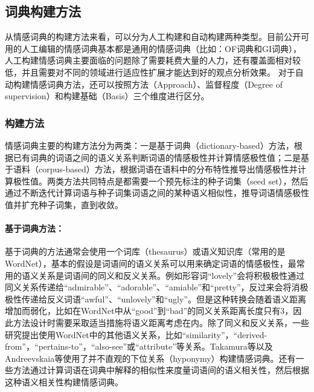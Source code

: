 \subsection{词典构建方法}
从情感词典的构建方法来看，可以分为人工构建和自动构建两种类型。目前公开可用的人工编辑的情感词典基本都是通用的情感词典（比如：OF词典和GI词典），人工构建情感词典主要面临的问题除了需要耗费大量的人力，还有覆盖面相对较低，并且需要对不同的领域进行适应性扩展才能达到好的观点分析效果。
对于自动构建情感词典方法，还可以按照方法（Approach）、监督程度（Degree of supervision）和构建基础（Basis）三个维度进行区分。

\subsubsection{构建方法}
情感词典主要的构建方法分为两类：一是基于词典（dictionary-based）方法，根据已有词典的词语之间的语义关系判断词语的情感极性并计算情感极性值；二是基于语料（corpus-based）方法，根据词语在语料中的分布特性推导出情感极性并计算极性值。两类方法共同特点是都需要一个预先标注的种子词集（seed set），然后通过不断迭代计算词语与种子词集词语之间的某种语义相似性，推导词语情感极性值并扩充种子词集，直到收敛。

\paragraph{基于词典方法：}
基于词典的方法通常会使用一个词库（thesaurus）或语义知识库（常用的是WordNet），基本的假设是词语间的语义关系可以用来确定词语的情感极性，最常用的语义关系是词语间的同义和反义关系。例如形容词“lovely”会将积极极性通过同义关系传递给“admirable”、“adorable”、“amiable”和“pretty”，反过来会将消极极性传递给反义词语“awful”、“unlovely”和“ugly”。但是这种转换会随着语义距离增加而弱化，比如在WordNet中从“good”到“bad”的同义关系距离长度只有3，因此方法设计时需要采取适当措施将语义距离考虑在内。除了同义和反义关系，一些研究提出使用WordNet中的其他语义关系，比如“similarity”，“derived-from”，“pertains-to”，“also-see”或“attribute”等关系。Takamura等以及Andreevskaia等使用了并不直观的下位关系（hyponymy）构建情感词典。还有一些方法通过计算词语在词典中解释的相似性来度量词语间的语义相关性，然后根据这种语义相关性构建情感词典。

